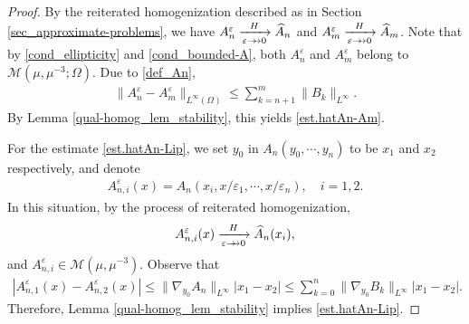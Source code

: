 \documentclass[reqno,12pt]{amsart} %
\newtheorem{theorem}{Theorem}[section]
\theoremstyle{definition}
\theoremstyle{remark}
\numberwithin{equation}{section}
\newcommand{\N}{\mathbb{N}}
\newcommand{\doublerightarrow}{%
  \mathrel{%
    \mathchoice
      {\rightarrow\mspace{-10mu}\rightarrow} %
      {\rightarrow\mspace{-10mu}\rightarrow} %
      {\rightarrow\mspace{-10mu}\rightarrow} %
      {\rightarrow\mspace{-10mu}\rightarrow} %
  }%
}
\begin{document}
\begin{proof}

By the reiterated homogenization described as in Section \ref{sec_approximate-problems}, we have $A_n^\varepsilon\xrightarrow[\varepsilon\doublerightarrow 0]{H} \widehat{A}_n$ and $A_m^\varepsilon\xrightarrow[\varepsilon\doublerightarrow 0]{H} \widehat{A}_m$. Note that by \eqref{cond_ellipticity} and \eqref{cond_bounded-A}, both $A_n^\varepsilon$ and $A_m^\varepsilon$ belong to $\mathcal{M}(\mu, \mu^{-3}; \Omega)$. Due to \eqref{def_An}, 
\begin{align*}
  \|A_n^\varepsilon-A_m^\varepsilon\|_{L^\infty(\Omega)}\leq \sum_{k=n+1}^m\|B_k\|_{L^\infty}. 
\end{align*}
By Lemma \ref{qual-homog_lem_stability}, this yields \eqref{est.hatAn-Am}. 

For the estimate \eqref{est.hatAn-Lip}, we set $y_0$ in $A_n(y_0, \cdots, y_n)$ to be $x_1$ and $x_2$ respectively, and denote
\begin{align*}
  A_{n, i}^\varepsilon(x)=A_n(x_i, x/\varepsilon_1, \cdots, x/\varepsilon_n),\quad i=1, 2. 
\end{align*}
In this situation, by the process of reiterated homogenization,
\begin{align*}
  A_{n ,i}^\varepsilon(x)\xrightarrow[\varepsilon\doublerightarrow 0]{H} \widehat{A}_n(x_i),
\end{align*}
and $A_{n, i}^\varepsilon\in \mathcal{M}(\mu, \mu^{-3})$. Observe that
\begin{align*}
  |A_{n, 1}^\varepsilon(x) - A_{n, 2}^\varepsilon(x) |\leq \|\nabla_{y_0}A_n\|_{L^\infty}|x_1-x_2|\leq \sum_{k=0}^n\|\nabla_{y_0}B_k\|_{L^\infty}|x_1-x_2|. 
\end{align*}
Therefore, Lemma \ref{qual-homog_lem_stability} implies \eqref{est.hatAn-Lip}. 
\end{proof}

\end{document}
